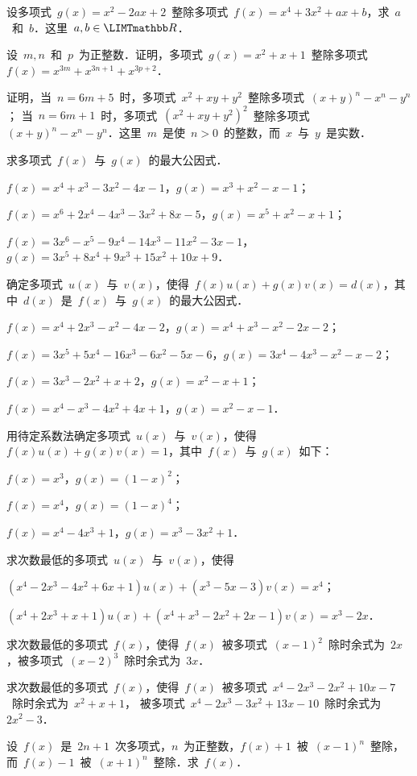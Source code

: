 \begin{exercise}
\item 设多项式~$g(x)=x^2-2ax+2$~整除多项式~$f(x)=x^4+3x^2+ax+b$，求~$a$~和~$b$．这里~$a,b\in\mR$．%
\item 设~$m,n$~和~$p$~为正整数．证明，多项式~$g(x)=x^2+x+1$~整除多项式~$f(x)=x^{3m}+x^{3n+1}+x^{3p+2}$．%
\item 证明，当~$n=6m+5$~时，多项式~$x^2+xy+y^2$~整除多项式~$(x+y)^n-x^n-y^n$；%
当~$n=6m+1$~时，多项式~$(x^2+xy+y^2)^2$~整除多项式~$(x+y)^n-x^n-y^n$．这里~$m$~是使~$n>0$~的整数，而~$x$~与~$y$~是实数．%
\item 求多项式~$f(x)$~与~$g(x)$~的最大公因式．%
\begin{question}
\item $f(x)=x^4+x^3-3x^2-4x-1$，$g(x)=x^3+x^2-x-1$；%
\item $f(x)=x^6+2x^4-4x^3-3x^2+8x-5$，$g(x)=x^5+x^2-x+1$；%
\item $f(x)=3x^6-x^5-9x^4-14x^3-11x^2-3x-1$，$g(x)=3x^5+8x^4+9x^3+15x^2+10x+9$．
\end{question}
\item 确定多项式~$u(x)$~与~$v(x)$，使得~$f(x)u(x)+g(x)v(x)=d(x)$，其中~$d(x)$~是~$f(x)$~与~$g(x)$~的最大公因式．%
\begin{question}
\item $f(x)=x^4+2x^3-x^2-4x-2$，$g(x)=x^4+x^3-x^2-2x-2$；%
\item $f(x)=3x^5+5x^4-16x^3-6x^2-5x-6$，$g(x)=3x^4-4x^3-x^2-x-2$；%
\item $f(x)=3x^3-2x^2+x+2$，$g(x)=x^2-x+1$；%
\item $f(x)=x^4-x^3-4x^2+4x+1$，$g(x)=x^2-x-1$．
\end{question}
\item 用待定系数法确定多项式~$u(x)$~与~$v(x)$，使得~$f(x)u(x)+g(x)v(x)=1$，其中~$f(x)$~与~$g(x)$~如下：
\begin{enumitemcols}
\item $f(x)=x^3$，$g(x)=(1-x)^2$；%
\item $f(x)=x^4$，$g(x)=(1-x)^4$；%
\item $f(x)=x^4-4x^3+1$，$g(x)=x^3-3x^2+1$．
\end{enumitemcols}
\item 求次数最低的多项式~$u(x)$~与~$v(x)$，使得
\begin{question}
\item $(x^4-2x^3-4x^2+6x+1)u(x)+(x^3-5x-3)v(x)=x^4$；%
\item $(x^4+2x^3+x+1)u(x)+(x^4+x^3-2x^2+2x-1)v(x)=x^3-2x$．
\end{question}
\item 求次数最低的多项式~$f(x)$，使得~$f(x)$~被多项式~$(x-1)^2$~除时余式为~$2x$，被多项式~$(x-2)^3$~除时余式为~$3x$．%
\item 求次数最低的多项式~$f(x)$，使得~$f(x)$~被多项式~$x^4-2x^3-2x^2+10x-7$~除时余式为~$x^2+x+1$，%
      被多项式~$x^4-2x^3-3x^2+13x-10$~除时余式为~$2x^2-3$．%
\item 设~$f(x)$~是~$2n+1$~次多项式，$n$~为正整数，$f(x)+1$~被~$(x-1)^n$~整除，
而~$f(x)-1$~被~$(x+1)^n$~整除．求~$f(x)$．
\end{exercise}

